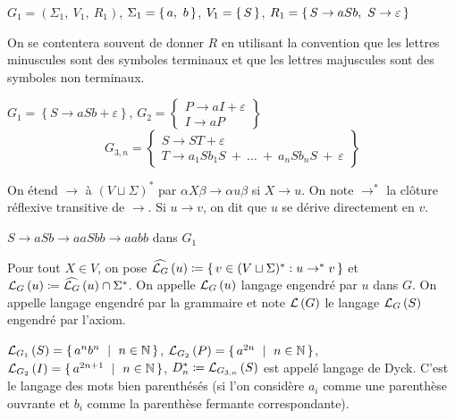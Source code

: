 \documentclass[../../agregation.tex]{subfiles}
\begin{document}
\begin{example}
	$G_{1}=\left(\Sigma_{1},\ V_{1},\ R_{1}\right)$, $\Sigma_{1}=\set{a,\ b}$,
	$V_{1}=\set S$, $R_{1}=\set{S\to aSb,\ S\to\varepsilon}$
\end{example}

\begin{rem}
	On se contentera souvent de donner $R$ en utilisant la convention
	que les lettres minuscules sont des symboles terminaux et que les
	lettres majuscules sont des symboles non terminaux.
\end{rem}

\begin{example}
	$G_{1}=\left\{ S\to aSb+\varepsilon\right\} $, $G_{2}=\left\{ \begin{array}{c}
	P\to aI+\varepsilon\\
	I\to aP
	\end{array}\right\} $
	$$G_{3,n}=\left\{ \begin{array}{c}
	S\to ST+\varepsilon\\
	T\to a_{1}Sb_{1}S\ +\ \dots\ +\ a_{n}Sb_{n}S\ +\ \varepsilon
	\end{array}\right\} $$
\end{example}

\begin{defn}[Dérivation]
	On étend $\to$ à $(V\sqcup\Sigma)^*$ par $\alpha X \beta \to \alpha u \beta$ si $X\to u$. On note $\to^*$ la clôture réflexive transitive de $\to$. Si $u\to v$, on dit que $u$ se dérive directement en $v$.
\end{defn}

\begin{example}
	$S\to aSb\to aaSbb\to aabb$ dans $G_{1}$
\end{example}

\begin{defn}
	Pour tout $X\in V$, on pose $\widehat{\mathcal{L}_{G}}\left(u\right)\coloneqq \set{v\in (V\sqcup\Sigma)^*:u\to^* v}$ et $\mathcal{L}_{G}\left(u\right)\coloneqq \widehat{\mathcal{L}_{G}}\left(u\right)\cap \Sigma^*$. On appelle $\mathcal{L}_{G}\left(u\right)$ langage engendré par $u$ dans $G$. On appelle langage engendré par la grammaire et note $\mathcal{L}\left(G\right)$ le langage $\mathcal{L}_{G}\left(S\right)$ engendré par l'axiom.
\end{defn}

\begin{example}
	$\L_{G_{1}}\left(S\right)=\set{a^{n}b^{n}\ |\ n\in\N}$, $\L_{G_{2}}\left(P\right)=\set{a^{2n}\ |\ n\in\N}$,
	$\L_{G_{2}}\left(I\right)=\set{a^{2n+1}\ |\ n\in\N}$, $D_{n}^{*}\coloneqq\mathcal{L}_{G_{3,n}}\left(S\right)$
	est appelé langage de Dyck. C'est le langage des mots bien parenthésés
	(si l'on considère $a_{i}$ comme une parenthèse ouvrante et $b_{i}$
	comme la parenthèse fermante correspondante).
\end{example}
\end{document}
